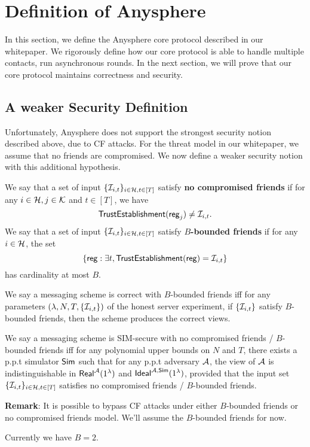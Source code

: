

\section{Definition of Anysphere}
In this section, we define the Anysphere core protocol described in our whitepaper. We rigorously define how our core protocol is able to handle multiple contacts, run asynchronous rounds. In the next section, we will prove that our core protocol maintains correctness and security.
\subsection{A weaker Security Definition}
Unfortunately, Anysphere does not support the strongest security notion described above, due to CF attacks. For the threat model in our whitepaper, we assume that no friends are compromised. We now define a weaker security notion with this additional hypothesis.
\begin{definition}
We say that a set of input $\{\mathcal{I}_{i, t}\}_{i \in \mathcal{H}, t \in [T]}$ satisfy \textbf{no compromised friends} if for any $i \in \mathcal{H}, j \in \mathcal{K}$ and $t \in [T]$, we have
$$\mathsf{TrustEstablishment}(\mathsf{reg}_j) \neq \mathcal{I}_{i, t}.$$
We say that a set of input $\{\mathcal{I}_{i, t}\}_{i \in \mathcal{H}, t \in [T]}$ satisfy \textbf{$B$-bounded friends} if for any $i \in \mathcal{H}$, the set
$$\{\mathsf{reg}: \exists t, \mathsf{TrustEstablishment}(\mathsf{reg}) = \mathcal{I}_{i, t}\}$$
has cardinality at most $B$.

We say a messaging scheme is correct with $B$-bounded friends iff for any parameters $(\lambda, N, T, \{\mathcal{I}_{i, t}\})$ of the honest server experiment, if $\{\mathcal{I}_{i, t}\}$ satisfy $B$-bounded friends, then the scheme produces the correct views.

We say a messaging scheme is SIM-secure with no compromised friends / $B$-bounded friends iff for any polynomial upper bounds on $N$ and $T$, there exists a p.p.t simulator $\mathsf{Sim}$ such that for any p.p.t adversary $\mathcal{A}$, the view of $\mathcal{A}$ is indistinguishable in $\mathsf{Real}^{\mathcal{A}}(1^{\lambda})$ and $\mathsf{Ideal}^{\mathcal{A}, \mathsf{\mathsf{Sim}}}(1^{\lambda})$, provided that the input set $\{\mathcal{I}_{i, t}\}_{i \in \mathcal{H}, t \in [T]}$ satisfies no compromised friends / $B$-bounded friends.
\end{definition}
\textbf{Remark}: It is possible to bypass CF attacks under either $B$-bounded friends or no compromised friends model. We'll assume the $B$-bounded friends for now.

Currently we have $B = 2$.

